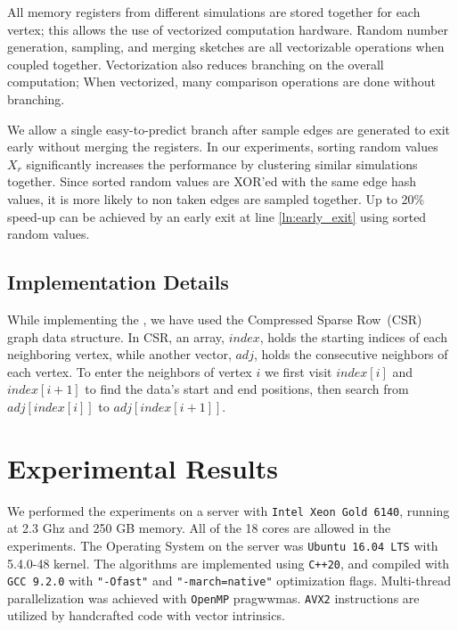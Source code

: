\documentclass[10pt,journal,compsoc]{IEEEtran}
\newcommand\acro{{\sc{HyperFuseR\xspace}\xspace}\xspace}
\begin{document}
 All memory registers from different simulations are stored together for each vertex; this allows the use of vectorized computation hardware. Random number generation, sampling, and merging sketches are all vectorizable operations when coupled together. Vectorization also reduces branching on the overall computation; When vectorized, many comparison operations are done without branching. 

We allow a single easy-to-predict branch after sample edges are generated to exit early without merging the registers. In our experiments, sorting random values $X_r$ significantly increases the performance by clustering similar simulations together. Since sorted random values are XOR'ed with the same edge hash values, it is more likely to non taken edges are sampled together. Up to 20\% speed-up can be achieved by an early exit at line \ref{ln:early_exit} using sorted random values.

\subsection{Implementation Details}
While implementing the \acro, we have used the Compressed Sparse Row~(CSR) graph data structure.
In CSR, an array, $index$, holds the starting indices of each neighboring vertex, while another vector, $adj$, holds the consecutive neighbors of each vertex. 
To enter the neighbors of vertex $i$ we first visit $index[i]$ and $index[i+1]$ 
to find the data's start and end positions, then search from $adj[index[i]]$ to $adj[index[i+1]]$. 
    
\section{Experimental Results}\label{sec:evaluation}
We performed the experiments on a server with {\tt Intel Xeon Gold 6140}, running at 2.3 Ghz and 250 GB memory. All of the 18 cores are allowed in the experiments. The Operating System on the server was {\tt Ubuntu 16.04 LTS} with 5.4.0-48 kernel. The algorithms are implemented using {\tt C++20}, and compiled with {\tt GCC 9.2.0} with {\tt "-Ofast"} and {\tt "-march=native"} optimization flags. Multi-thread parallelization was achieved with {\tt OpenMP} pragwwmas. {\tt AVX2} instructions are utilized by handcrafted code with vector intrinsics.
\end{document}
